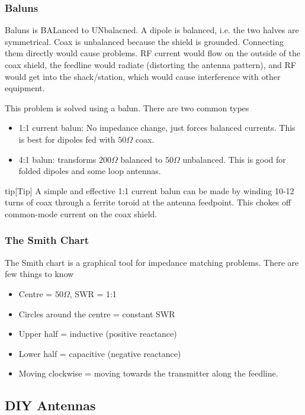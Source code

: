\documentclass{article}
\begin{document}
\subsubsection{Baluns}
Baluns is BALanced to UNbalacned. A dipole is balanced, i.e. the two halves are symmetrical. Coax is unbalanced because the shield is grounded. Connecting them directly would cause problems. RF current would flow on the outside of the coax shield, the feedline would radiate (distorting the antenna pattern), and RF would get into the shack/station, which would cause interference with other equipment.

This problem is solved using a balun. There are two common types
\begin{itemize}
    \item 1:1 current balun: No impedance change, just forces balanced currents. This is best for dipoles fed with $50\Omega $ coax.
    \item 4:1 balun: transforms $200\Omega $ balanced to $50\Omega $ unbalanced. This is good for folded dipoles and some loop antennas.
\end{itemize}
\begin{callout}{tip}[Tip]
A simple and effective 1:1 current balun can be made by winding 10-12 turns of coax through a ferrite toroid at the antenna feedpoint. This chokes off common-mode current on the coax shield.
\end{callout}

\subsubsection{The Smith Chart}
The Smith chart is a graphical tool for impedance matching problems. There are few things to know
\begin{itemize}
    \item Centre = $50\Omega $, SWR = 1:1
    \item Circles around the centre = constant SWR
    \item Upper half = inductive (positive reactance)
    \item Lower half = capacitive (negative reactance)
    \item Moving clockwise = moving towards the transmitter along the feedline.
\end{itemize}

\subsection{DIY Antennas}
\end{document}
